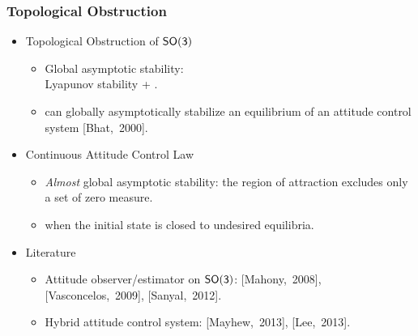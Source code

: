 \begin{frame} %
\frametitle{Topological Obstruction}
\begin{itemize} 
\item Topological Obstruction of $\mathsf{SO(3)}$
	\begin{itemize} 
	\item Global asymptotic stability: \\ Lyapunov stability + . 	
	\vspace*{0.05cm} 
	\item {} can globally asymptotically stabilize an equilibrium of an attitude control system	[Bhat,~2000].
	\end{itemize} 
	\vspace*{0.2cm}	
\item Continuous Attitude Control Law
	\begin{itemize}
	\item \textit{Almost} global asymptotic stability: the region of attraction excludes only a set of zero measure. 
	\vspace*{0.05cm} 
	\item {} when the initial state is closed to undesired equilibria.
	\end{itemize} 	
\pause	
	\vspace*{0.2cm}	
	\item Literature
		\begin{itemize} 
		\item Attitude observer/estimator on $\mathsf{SO(3)}$: [Mahony,~2008], [Vasconcelos,~2009], [Sanyal,~2012].
		\vspace*{0.05cm} 
		\item Hybrid attitude control system: [Mayhew,~2013], [Lee,~2013].
		\end{itemize}
	
\end{itemize}	
\end{frame}   %




